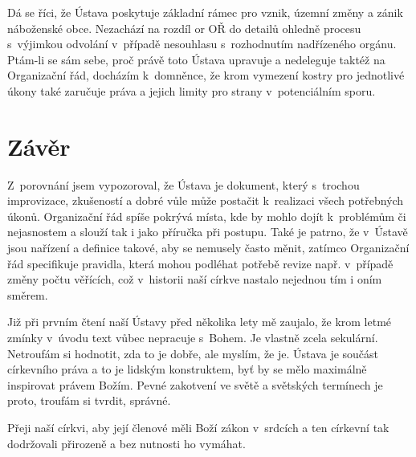 Dá se říci, že Ústava poskytuje základní rámec pro vznik, územní změny a zánik
náboženské obce. Nezachází na rozdíl or OŘ do detailů ohledně procesu s~výjimkou
odvolání v~případě nesouhlasu s~rozhodnutím nadřízeného orgánu. Ptám-li se sám
sebe, proč právě toto Ústava upravuje a nedeleguje taktéž na Organizační řád,
docházím k~domněnce, že krom vymezení kostry pro jednotlivé úkony také zaručuje
práva a jejich limity pro strany v~potenciálním sporu.

\chapter{Závěr}

Z~porovnání jsem vypozoroval, že Ústava je dokument, který s~trochou
improvizace, zkušeností a dobré vůle může postačit k~realizaci všech potřebných
úkonů. Organizační řád spíše pokrývá místa, kde by mohlo dojít k~problémům či
nejasnostem a slouží tak i jako příručka při postupu. Také je patrno, že
v~Ústavě jsou nařízení a definice takové, aby se nemusely často měnit, zatímco
Organizační řád specifikuje pravidla, která mohou podléhat potřebě revize např.
v~případě změny počtu věřících, což v~historii naší církve nastalo nejednou tím
i oním směrem.

Již při prvním čtení naší Ústavy před několika lety mě zaujalo, že krom letmé
zmínky v~úvodu text vůbec nepracuje s~Bohem. Je vlastně zcela sekulární.
Netroufám si hodnotit, zda to je dobře, ale myslím, že je. Ústava je součást
církevního práva a to je lidským konstruktem, byť by se mělo maximálně
inspirovat právem Božím. Pevné zakotvení ve světě a světských termínech je
proto, troufám si tvrdit, správné.

Přeji naší církvi, aby její členové měli Boží zákon v~srdcích a ten církevní tak
dodržovali přirozeně a bez nutnosti ho vymáhat.
